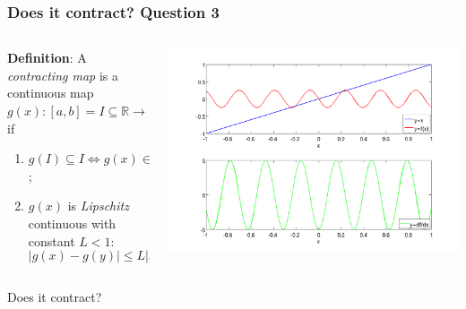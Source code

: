 \documentclass{beamer}
\begin{document}
\begin{frame}
\frametitle{Does it contract? Question 3}

\begin{columns}
    \begin{column}{0.45\textwidth}
  {\bf Definition}: A \emph{contracting map} is a continuous map
  $g(x) : [a, b] = I \subseteq \mathbb{R} \rightarrow \mathbb{R}$ if
\begin{enumerate}
  \item $g(I) \subseteq I \Leftrightarrow g(x) \in I \, \, \, \forall
    x \in I$;
  \item $g(x)$ is \emph{Lipschitz} continuous with constant $L < 1$:
    \begin{equation*}
      | g(x) - g(y) | \leq L | x - y | \, \, \, \forall x, y \in I.
    \end{equation*}
  \end{enumerate}
\end{column}
\begin{column}{0.55\textwidth}
  \begin{center}
   \includegraphics[width=\textwidth]{figures/cmap5}
  \end{center}
\end{column}
\end{columns}
\begin{overlayarea}{\textwidth}{0.1\textheight}
Does it contract?
\end{overlayarea}
\end{frame}
\end{document}
